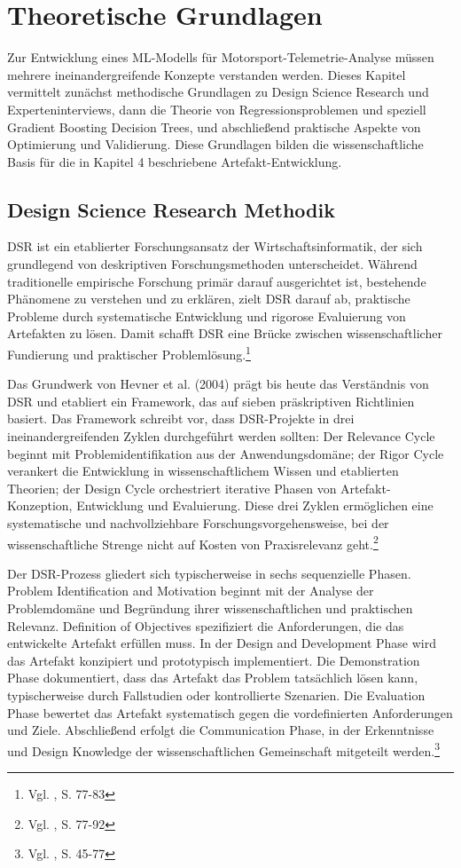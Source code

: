 \chapter{Theoretische Grundlagen}

Zur Entwicklung eines \ac{ML}-Modells für Motorsport-Telemetrie-Analyse 
müssen mehrere ineinandergreifende Konzepte verstanden werden. Dieses Kapitel 
vermittelt zunächst methodische Grundlagen zu Design Science Research und Experteninterviews, dann die Theorie von Regressionsproblemen und speziell 
Gradient Boosting Decision Trees, und abschließend praktische Aspekte von 
Optimierung und Validierung. Diese Grundlagen bilden die wissenschaftliche Basis 
für die in Kapitel 4 beschriebene Artefakt-Entwicklung.


\section{Design Science Research Methodik}

\ac{DSR} ist ein etablierter Forschungsansatz der Wirtschaftsinformatik, der sich grundlegend von deskriptiven Forschungsmethoden unterscheidet. Während traditionelle empirische Forschung primär darauf ausgerichtet ist, bestehende Phänomene zu verstehen und zu erklären, zielt \ac{DSR} darauf ab, praktische Probleme durch systematische Entwicklung und rigorose Evaluierung von Artefakten zu lösen. Damit schafft \ac{DSR} eine Brücke zwischen wissenschaftlicher Fundierung und praktischer Problemlösung.\footnote{Vgl. \cite{Hevner2004}, S. 77-83}

Das Grundwerk von Hevner et al. (2004) prägt bis heute das Verständnis von \ac{DSR} und etabliert ein Framework, das auf sieben präskriptiven Richtlinien basiert. Das Framework schreibt vor, dass \ac{DSR}-Projekte in drei ineinandergreifenden Zyklen durchgeführt werden sollten: Der Relevance Cycle beginnt mit Problemidentifikation aus der Anwendungsdomäne; der Rigor Cycle verankert die Entwicklung in wissenschaftlichem Wissen und etablierten Theorien; der Design Cycle orchestriert iterative Phasen von Artefakt-Konzeption, Entwicklung und Evaluierung. Diese drei Zyklen ermöglichen eine systematische und nachvollziehbare Forschungsvorgehensweise, bei der wissenschaftliche Strenge nicht auf Kosten von Praxisrelevanz geht.\footnote{Vgl. \cite{Hevner2004}, S. 77-92}

Der \ac{DSR}-Prozess gliedert sich typischerweise in sechs sequenzielle Phasen. Problem Identification and Motivation beginnt mit der Analyse der Problemdomäne und Begründung ihrer wissenschaftlichen und praktischen Relevanz. Definition of Objectives spezifiziert die Anforderungen, die das entwickelte Artefakt erfüllen muss. In der Design and Development Phase wird das Artefakt konzipiert und prototypisch implementiert. Die Demonstration Phase dokumentiert, dass das Artefakt das Problem tatsächlich lösen kann, typischerweise durch Fallstudien oder kontrollierte Szenarien. Die Evaluation Phase bewertet das Artefakt systematisch gegen die vordefinierten Anforderungen und Ziele. Abschließend erfolgt die Communication Phase, in der Erkenntnisse und Design Knowledge der wissenschaftlichen Gemeinschaft mitgeteilt werden.\footnote{Vgl. \cite{Peffers2007}, S. 45-77} 

